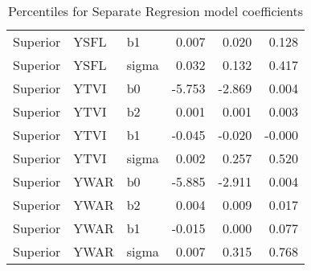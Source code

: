 \begin{table}[ht]
\begin{center}
\begin{tabular}{lllrrr}
  Superior & YSFL & b1 & 0.007 & 0.020 & 0.128 \\ 
  Superior & YSFL & sigma & 0.032 & 0.132 & 0.417 \\ 
  Superior & YTVI & b0 & -5.753 & -2.869 & 0.004 \\ 
  Superior & YTVI & b2 & 0.001 & 0.001 & 0.003 \\ 
  Superior & YTVI & b1 & -0.045 & -0.020 & -0.000 \\ 
  Superior & YTVI & sigma & 0.002 & 0.257 & 0.520 \\ 
  Superior & YWAR & b0 & -5.885 & -2.911 & 0.004 \\ 
  Superior & YWAR & b2 & 0.004 & 0.009 & 0.017 \\ 
  Superior & YWAR & b1 & -0.015 & 0.000 & 0.077 \\ 
  Superior & YWAR & sigma & 0.007 & 0.315 & 0.768 \\ 
   \hline
\end{tabular}
\caption{Percentiles for Separate Regresion model coefficients}
\end{center}
\end{table}

